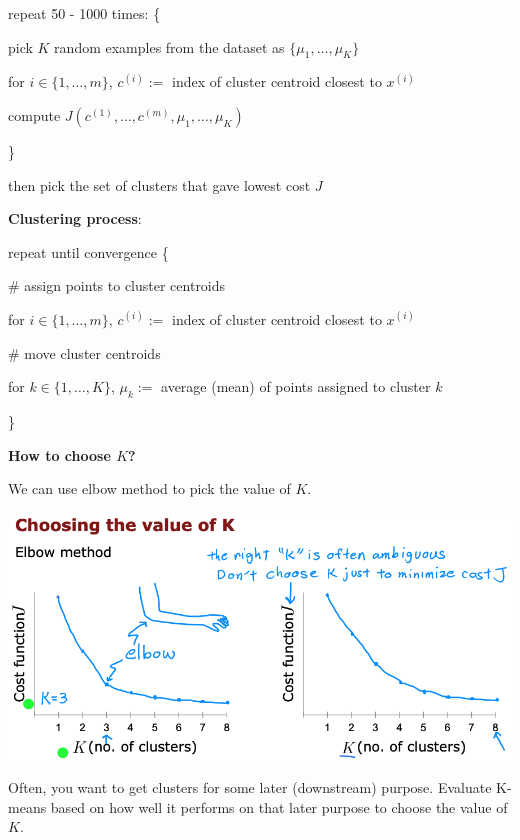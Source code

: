 \documentclass{article}
\begin{document}
\noindent repeat 50 - 1000 times: \{

pick \(K\) random examples from the dataset as \(\{\mu_{1}, \dots, \mu_{K}\}\)

for \(i \in \{1, \dots, m\}\), \(c^{(i)} := \) index of cluster centroid closest to \(x^{(i)}\)

compute \(J(c^{(1)}, \dots, c^{(m)}, \mu_{1}, \dots, \mu_{K})\)

\noindent \}

\noindent then pick the set of clusters that gave lowest cost \(J\)

\bigskip

\noindent \textbf{Clustering process}:

\noindent repeat until convergence \{

\# assign points to cluster centroids

for \(i \in \{1, \dots, m\}\), \(c^{(i)} := \) index of cluster centroid closest to \(x^{(i)}\)

\# move cluster centroids

for \(k \in \{1, \dots, K\}\), \(\mu_{k} := \) average (mean) of points assigned to cluster \(k\)

\noindent \}

\bigskip

\noindent \textbf{How to choose \(K\)?}

\noindent We can use elbow method to pick the value of \(K\).

\begin{center}
\includegraphics[scale=0.3]{./images/k_means_elbow_method.png}
\end{center}

\noindent Often, you want to get clusters for some later (downstream) purpose. Evaluate K-means based on how well it performs on that later purpose to choose the value of \(K\).
\end{document}
